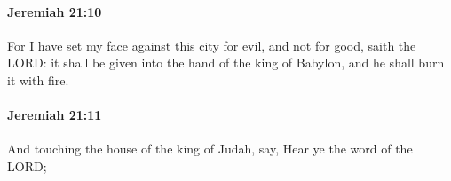 		\paragraph{Jeremiah 21:10} %
			\label{JEREMIAH-21-10}

			For I have set my face against this city for evil, and not for good, saith the LORD: it shall be given into the hand of the king of Babylon, and he shall burn it with fire.


		\paragraph{Jeremiah 21:11} %
			\label{JEREMIAH-21-11}

			And touching the house of the king of Judah, say, Hear ye the word of the LORD;


